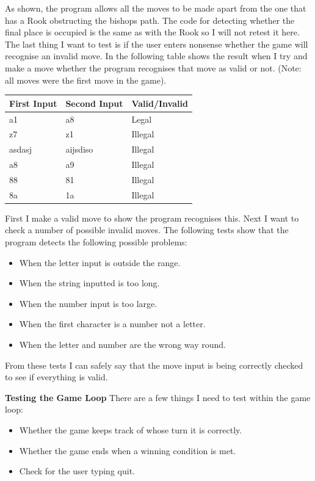 \documentclass[a4paper]{article}
\begin{document}
As shown, the program allows all the moves to be made apart from the one that has a Rook obstructing the bishops path. The code for detecting whether the final place is occupied is the same as with the Rook so I will not retest it here. The last thing I want to test is if the user enters nonsense whether the game will recognise an invalid move. In the following table shows the result when I try and make a move whether the program recognises that move as valid or not. (Note: all moves were the first move in the game).
\begin{table}[H]
\begin{tabular}{|l|l|l|}
\hline
\textbf{First Input} & \textbf{Second Input} & \textbf{Valid/Invalid} \\ \hline
a1                   & a8                    & Legal                  \\ \hline
z7                   & z1                    & Illegal                \\ \hline
asdasj               & aijsdiso              & Illegal                \\ \hline
a8                   & a9                    & Illegal                \\ \hline
88                   & 81                    & Illegal                \\ \hline
8a                   & 1a                    & Illegal                \\ \hline
\end{tabular}
\end{table}
First I make a valid move to show the program recognises this. Next I want to check a number of possible invalid moves. The following tests show that the program detects the following possible problems: \begin{itemize}
\item When the letter input is outside the range.
\item When the string inputted is too long.
\item When the number input is too large.
\item When the first character is a number not a letter.
\item When the letter and number are the wrong way round.
\end{itemize}
From these tests I can safely say that the move input is being correctly checked to see if everything is valid. \newline

\noindent \textbf{Testing the Game Loop}
There are a few things I need to test within the game loop: \begin{itemize}
\item Whether the game keeps track of whose turn it is correctly.
\item Whether the game ends when a winning condition is met.
\item Check for the user typing quit.
\end{itemize}
\end{document}
